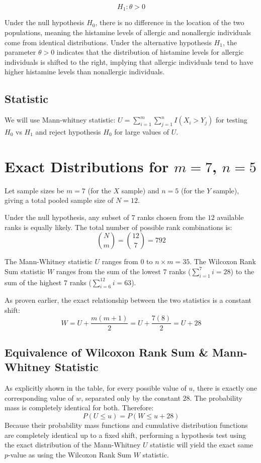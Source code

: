 \documentclass[10pt]{article}
\begin{document}
\[
H_1 : \theta > 0
\]

Under the null hypothesis $H_0$, there is no difference in the location of the two populations, meaning the histamine levels of allergic and nonallergic individuals come from identical distributions. Under the alternative hypothesis $H_1$, the parameter $\theta>0$ indicates that the distribution of histamine levels for allergic individuals is shifted to the right, implying that allergic individuals tend to have higher histamine levels than nonallergic individuals.
\subsection{Statistic} We will use Mann-whitney statistic: $U = \sum_{i=1}^m \sum_{j=1}^n I(X_i > Y_j)$ for testing $H_0$ vs $H_1$ and reject hypothesis $H_0$ for large values of $U$.

\section{Exact Distributions for $m = 7$, $n = 5$}

Let sample sizes be $m=7$ (for the $X$ sample) and $n=5$ (for the $Y$ sample), giving a total pooled sample size of $N = 12$. 

Under the null hypothesis, any subset of $7$ ranks chosen from the $12$ available ranks is equally likely. The total number of possible rank combinations is:
$$\binom{N}{m} = \binom{12}{7} = 792$$

The Mann-Whitney statistic $U$ ranges from $0$ to $n \times m = 35$. 
The Wilcoxon Rank Sum statistic $W$ ranges from the sum of the lowest $7$ ranks ($\sum_{i=1}^7 i = 28$) to the sum of the highest $7$ ranks ($\sum_{i=6}^{12} i = 63$). 

As proven earlier, the exact relationship between the two statistics is a constant shift:
$$W = U + \frac{m(m+1)}{2} = U + \frac{7(8)}{2} = U + 28$$

\subsection{Equivalence of Wilcoxon Rank Sum \& Mann-Whitney Statistic}

As explicitly shown in the table, for every possible value of $u$, there is exactly one corresponding value of $w$, separated only by the constant $28$. The probability mass is completely identical for both. Therefore:
$$P(U \le u) = P(W \le u + 28)$$
Because their probability mass functions and cumulative distribution functions are completely identical up to a fixed shift, performing a hypothesis test using the exact distribution of the Mann-Whitney $U$ statistic will yield the exact same $p$-value as using the Wilcoxon Rank Sum $W$ statistic.
\end{document}
